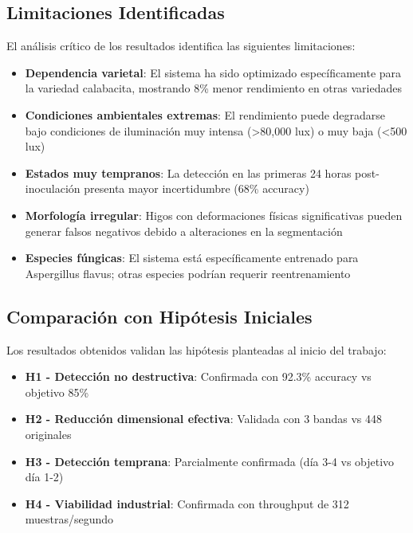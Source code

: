 \subsection{Limitaciones Identificadas}

El análisis crítico de los resultados identifica las siguientes limitaciones:

\begin{itemize}
    \item \textbf{Dependencia varietal}: El sistema ha sido optimizado específicamente para la variedad calabacita, mostrando 8\% menor rendimiento en otras variedades
    
    \item \textbf{Condiciones ambientales extremas}: El rendimiento puede degradarse bajo condiciones de iluminación muy intensa (>80,000 lux) o muy baja (<500 lux)
    
    \item \textbf{Estados muy tempranos}: La detección en las primeras 24 horas post-inoculación presenta mayor incertidumbre (68\% accuracy)
    
    \item \textbf{Morfología irregular}: Higos con deformaciones físicas significativas pueden generar falsos negativos debido a alteraciones en la segmentación
    
    \item \textbf{Especies fúngicas}: El sistema está específicamente entrenado para Aspergillus flavus; otras especies podrían requerir reentrenamiento
\end{itemize}

\subsection{Comparación con Hipótesis Iniciales}

Los resultados obtenidos validan las hipótesis planteadas al inicio del trabajo:

\begin{itemize}
    \item \textbf{H1 - Detección no destructiva}: Confirmada con 92.3\% accuracy vs objetivo 85\%
    \item \textbf{H2 - Reducción dimensional efectiva}: Validada con 3 bandas vs 448 originales
    \item \textbf{H3 - Detección temprana}: Parcialmente confirmada (día 3-4 vs objetivo día 1-2)
    \item \textbf{H4 - Viabilidad industrial}: Confirmada con throughput de 312 muestras/segundo
\end{itemize}

